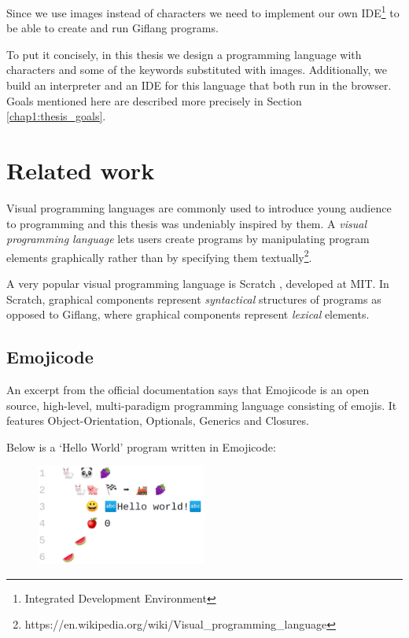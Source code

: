 Since we use images instead of characters we need to implement our own IDE\footnote{Integrated Development Environment} to be able to
create and run Giflang programs.

To put it concisely, in this thesis we design a programming language with characters and some of the keywords substituted with images.
Additionally, we build an interpreter and an IDE for this language that both run in the browser. Goals mentioned here are described
more precisely in Section \ref{chap1:thesis_goals}. 

\section{Related work}
\label{chap1:related_work}
Visual programming languages are commonly used to introduce young audience to programming and this thesis was undeniably inspired by them.
A \emph{visual programming language} lets users create programs by manipulating program elements graphically rather than by specifying them
textually\footnote{https://en.wikipedia.org/wiki/Visual\_programming\_language}.

A very popular visual programming language is Scratch \cite{Scratch}, developed at MIT. In Scratch, graphical components represent \emph{syntactical}
structures of programs as opposed to Giflang, where graphical components represent \emph{lexical} elements.

\subsection{Emojicode}
An excerpt from the official documentation says that Emojicode \cite{Emojicode} is an open source, high-level, multi-paradigm programming language consisting of emojis.
It features Object-Orientation, Optionals, Generics and Closures.

Below is a `Hello World' program written in Emojicode:
\begin{figure}[!hbt]
	\includegraphics[width=0.5\textwidth]{../img/emojicode_helloworld}
	\label{fig:chap1:emojicode_helloworld}
\end{figure}

